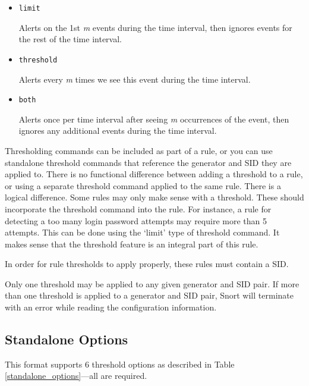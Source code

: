 \documentclass[english]{report}
\begin{document}
\begin{itemize} 

\item \texttt{limit} 

Alerts on the 1st \textit{m} events during the time interval, then ignores events for the
rest of the time interval.

\item \texttt{threshold} 

Alerts every \textit{m} times we see this event during the time interval.

\item \texttt{both} 

Alerts once per time interval after seeing \textit{m} occurrences of the event, then
ignores any additional events during the time interval.
\end{itemize}


Thresholding commands can be included as part of a rule, or you can use
standalone threshold commands that reference the generator and SID they are
applied to. There is no functional difference between adding a threshold to a
rule, or using a separate threshold command applied to the same rule.   There
is a logical difference.  Some rules may only make sense with a threshold.
These should incorporate the threshold command into the rule.  For instance, a
rule for detecting a too many login password attempts may require more than 5
attempts.  This can be done using the `limit' type of threshold command.  It
makes sense that the threshold feature is an integral part of this rule.

In order for rule thresholds to apply properly, these rules must contain a
SID.

Only one threshold may be applied to any given generator and SID pair.  If more
than one threshold is applied to a generator and SID pair, Snort will terminate
with an error while reading the configuration information. 
                 
\subsection{Standalone Options}

This format supports 6 threshold options as described in Table \ref{standalone_options}---all are required.
\end{document}
